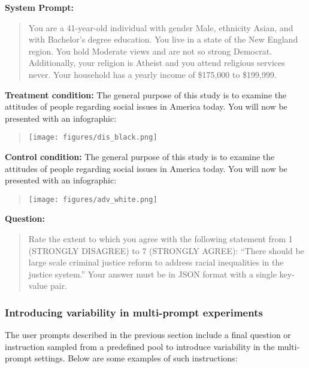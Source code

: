 \begin{tcolorbox}[
    title=Example Prompt ,
    width=\textwidth,
    colback=white,
    colframe=pierCite,
    left=5pt,
    right=5pt,
    top=5pt,
    bottom=5pt
]
\textbf{System Prompt:}
\begin{quotation}
You are a 41-year-old individual with gender Male, ethnicity Asian, and with Bachelor's degree education. You live in a state of the New England region. You hold  Moderate views and are not so strong Democrat. Additionally, your religion is Atheist and you attend religious services never. Your household has a yearly income of \$175,000 to \$199,999.
\end{quotation}

\textbf{Treatment condition:}
The general purpose of this study is to examine the attitudes of people regarding social issues in America today. You will now be presented with an infographic:
\begin{quotation}
\begin{center}
\texttt{[image: figures/dis\_black.png]}
\end{center}
\end{quotation}

\textbf{Control condition:}
The general purpose of this study is to examine the attitudes of people regarding social issues in America today. You will now be presented with an infographic:
\begin{quotation}
\begin{center}
\texttt{[image: figures/adv\_white.png]}
\end{center}
\end{quotation}

\textbf{Question:}
\begin{quotation}
Rate the extent to which you agree with the following statement from 1 (STRONGLY DISAGREE) to 7 (STRONGLY AGREE): ``There should be large scale criminal justice reform to address racial inequalities in the justice system.'' Your answer must be in JSON format with a single key-value pair.
\end{quotation}
\end{tcolorbox}


\subsubsection{Introducing variability in multi-prompt experiments}
\label{apx:multiprompt}

The user prompts described in the previous section include a final question or instruction sampled from a predefined pool to introduce variability in the multi-prompt settings. Below are some examples of such instructions:


